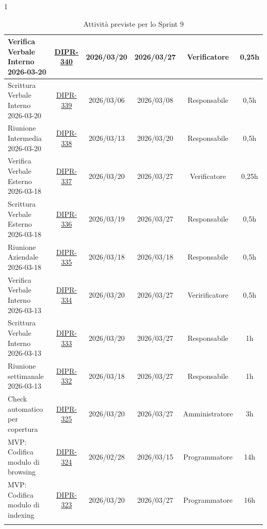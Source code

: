 \documentclass[a4paper,12pt]{article}
\begin{document}
\begin{spacing}{1}
\begin{longtable}{|p{4cm}|c|c|c|c|c|}
        \hline
        Verifica Verbale Interno 2026-03-20 & \href{https://7zpus.atlassian.net/browse/DIPR-340}{DIPR-340} & 2026/03/20 & 2026/03/27 & Verificatore & 0,25h \\
        \hline
        Scrittura Verbale Interno 2026-03-20 & \href{https://7zpus.atlassian.net/browse/DIPR-339}{DIPR-339} & 2026/03/06 & 2026/03/08 & Responsabile & 0,5h \\
        \hline
        Riunione Intermedia 2026-03-20 & \href{https://7zpus.atlassian.net/browse/DIPR-338}{DIPR-338} & 2026/03/13 & 2026/03/20 & Responsabile & 0,5h \\
        \hline
        Verifica Verbale Esterno 2026-03-18 & \href{https://7zpus.atlassian.net/browse/DIPR-337}{DIPR-337} & 2026/03/20 & 2026/03/27 & Verificatore & 0,25h \\
        \hline
        Scrittura Verbale Esterno 2026-03-18 & \href{https://7zpus.atlassian.net/browse/DIPR-336}{DIPR-336} & 2026/03/19 & 2026/03/27 & Responsabile & 0,5h \\
        \hline
        Riunione Aziendale 2026-03-18 & \href{https://7zpus.atlassian.net/browse/DIPR-335}{DIPR-335} & 2026/03/18 & 2026/03/18 & Responsabile & 0,5h \\
        \hline
        Verifica Verbale Interno 2026-03-13 & \href{https://7zpus.atlassian.net/browse/DIPR-334}{DIPR-334} & 2026/03/20 & 2026/03/27 & Veririficatore & 0,5h \\
        \hline
        Scrittura Verbale Interno 2026-03-13 & \href{https://7zpus.atlassian.net/browse/DIPR-333}{DIPR-333} & 2026/03/20 & 2026/03/27 & Responsabile & 1h \\
        \hline
        Riunione settimanale 2026-03-13 & \href{https://7zpus.atlassian.net/browse/DIPR-332}{DIPR-332} & 2026/03/18 & 2026/03/27 & Responsabile & 1h \\
        \hline
        Check automatico per copertura & \href{https://7zpus.atlassian.net/browse/DIPR-325}{DIPR-325} & 2026/03/20 & 2026/03/27 & Amministratore & 3h \\
        \hline
        [BACKEND] MVP: Codifica modulo di browsing & \href{https://7zpus.atlassian.net/browse/DIPR-324}{DIPR-324} & 2026/02/28 & 2026/03/15 & Programmatore & 14h \\
        \hline
        [BACKEND] MVP: Codifica modulo di indexing & \href{https://7zpus.atlassian.net/browse/DIPR-323}{DIPR-323} & 2026/03/20 & 2026/03/27 & Programmatore & 16h \\
        \hline
        \rowcolor{white}
        \caption{Attività previste per lo Sprint 9}
    \end{longtable}
    \end{spacing}
\end{document}

